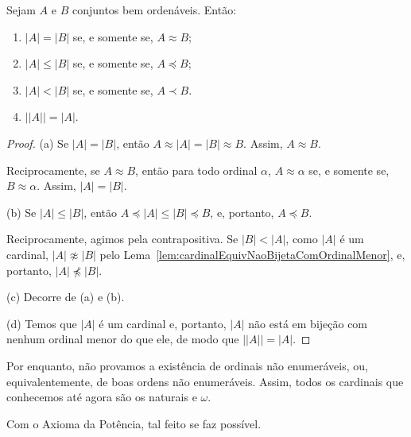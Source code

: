 \begin{lemma}\label{lem:propriedadesElementaresDosCardinais}
    Sejam $A$ e $B$ conjuntos bem ordenáveis.
    Então:
    \begin{enumerate}[label=(\alph*)]
        \item $|A|=|B|$ se, e somente se, $A\approx B$;
        \item $|A|\leq |B|$ se, e somente se, $A\preceq B$;
        \item $|A|<|B|$ se, e somente se, $A\prec B$.
        \item $||A||=|A|$.
    \end{enumerate}
\end{lemma}
\begin{proof}
    (a) Se $|A|=|B|$, então $A\approx |A|=|B|\approx B$.
    Assim, $A\approx B$.

    Reciprocamente, se $A\approx B$, então para todo ordinal $\alpha$, $A\approx \alpha$ se, e somente se, $B\approx \alpha$.
    Assim, $|A|=|B|$.

    (b) Se $|A|\leq |B|$, então $A\preceq |A|\leq |B|\preceq B$, e, portanto, $A\preceq B$.

    Reciprocamente, agimos pela contrapositiva.
    Se $|B|<|A|$, como $|A|$ é um cardinal, $|A|\not\approx |B|$ pelo Lema~\ref{lem:cardinalEquivNaoBijetaComOrdinalMenor}, e, portanto, $|A|\not\preceq |B|$.

    (c) Decorre de (a) e (b).

    (d) Temos que $|A|$ é um cardinal e, portanto, $|A|$ não está em bijeção com nenhum ordinal menor do que ele, de modo que $||A||=|A|$.
\end{proof}

Por enquanto, não provamos a existência de ordinais não enumeráveis, ou, equivalentemente, de boas ordens não enumeráveis.
Assim, todos os cardinais que conhecemos até agora são os naturais e $\omega$.

Com o Axioma da Potência, tal feito se faz possível.

